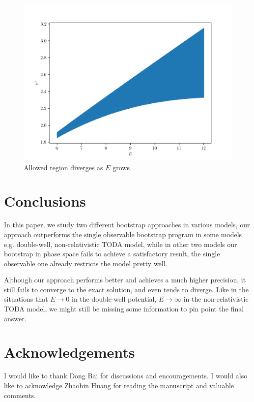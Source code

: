 \documentclass[aps, preprint,amsmath, amssymb]{revtex4-2}
\begin{document}
\begin{figure}
	\includegraphics[width=0.8\linewidth]{todal.png}
	\caption{Allowed region diverges as $E$ grows}
	\label{fig:todal}
\end{figure}

\section{Conclusions}
In this paper, we study two different bootstrap approaches in various models, our approach outperforms the single observable bootstrap program in some models e.g. double-well, non-relativistic TODA model, while in other two models our bootstrap in phase space fails to achieve a satisfactory result, the single observable one already restricts the model pretty well.

Although our approach performs better and achieves a much higher precision, it still fails to converge to the exact solution, and even tends to diverge. Like in the situations that $E \to 0$ in the double-well potential, $E \to \infty$ in the non-relativistic TODA model, we might still be missing some information to pin point the final answer.

\section*{Acknowledgements}
I would like to thank Dong Bai for discussions and encouragements. I would also like to acknowledge Zhaobin Huang for reading the manuscript and valuable comments.


\end{document}
